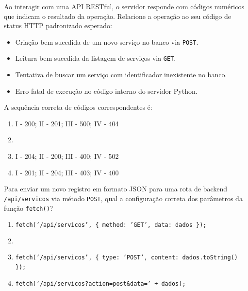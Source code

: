 \begin{tcolorbox}[colback=white, colframe=azulTitulo, title=\textbf{Questão 9: Protocolo HTTP e Códigos de Status (Status Codes)}]
    Ao interagir com uma API RESTful, o servidor responde com códigos numéricos que indicam o resultado da operação. Relacione a operação ao seu código de status HTTP padronizado esperado:
    \begin{itemize}[leftmargin=1.5cm]
        \item [I.] Criação bem-sucedida de um novo serviço no banco via \texttt{POST}.
        \item [II.] Leitura bem-sucedida da listagem de serviços via \texttt{GET}.
        \item [III.] Tentativa de buscar um serviço com identificador inexistente no banco.
        \item [IV.] Erro fatal de execução no código interno do servidor Python.
    \end{itemize}
    A sequência correta de códigos correspondentes é:
    \begin{enumerate}[label=\alph*)]
        \item I - 200; II - 201; III - 500; IV - 404
        \item {}
        \item I - 204; II - 200; III - 400; IV - 502
        \item I - 201; II - 204; III - 403; IV - 400
    \end{enumerate}
\end{tcolorbox}

\begin{tcolorbox}[colback=white, colframe=azulTitulo, title=\textbf{Questão 10: Envio de Dados com a Fetch API}]
    Para enviar um novo registro em formato JSON para uma rota de backend \texttt{/api/servicos} via método \texttt{POST}, qual a configuração correta dos parâmetros da função \texttt{fetch()}?
    \begin{enumerate}[label=\alph*)]
        \item \texttt{fetch('/api/servicos', \{ method: 'GET', data: dados \});}
        \item {}
        \item \texttt{fetch('/api/servicos', \{ type: 'POST', content: dados.toString() \});}
        \item \texttt{fetch('/api/servicos?action=post\&data=' + dados);}
    \end{enumerate}
\end{tcolorbox}

